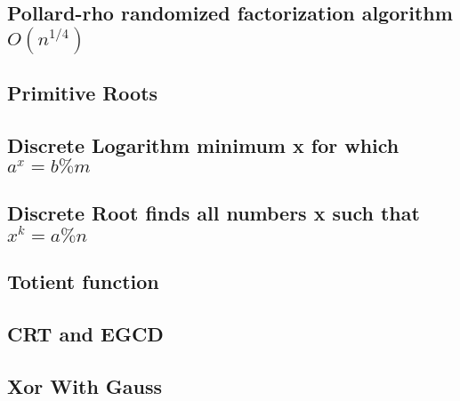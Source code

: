 \subsection{Pollard-rho randomized factorization algorithm ${O(n^{1/4})}$}
\vspace{-2ex}
\raggedbottom
\vspace{-3.2ex}
\hrulefill
\subsection{Primitive Roots}
\vspace{-2ex}
\raggedbottom
\vspace{-3.2ex}
\hrulefill
\subsection{Discrete Logarithm minimum x for which ${a^x = b \% m}$}
\vspace{-2ex}
\raggedbottom
\vspace{-3.2ex}
\hrulefill
\subsection{Discrete Root finds all numbers x such that ${x^k = a \% n}$}
\vspace{-2ex}
\raggedbottom
\vspace{-3.2ex}
\hrulefill
\subsection{Totient function}
\vspace{-2ex}
\raggedbottom
\vspace{-3.2ex}
\hrulefill
\subsection{CRT and EGCD}
\vspace{-2ex}
\raggedbottom
\vspace{-3.2ex}
\hrulefill
\subsection{Xor With Gauss}
\vspace{-2ex}
\raggedbottom
\vspace{-3.2ex}
\hrulefill
